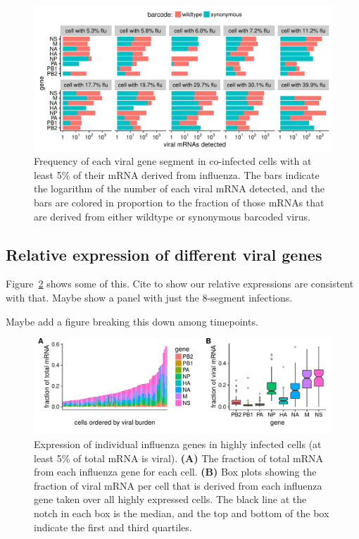 \documentclass[9pt,lineno]{elife}
\begin{document}
\begin{figure}
\includegraphics[width=\linewidth]{figures/p_coinfection.pdf}
\caption{
Frequency of each viral gene segment in co-infected cells with at least 5\% of their mRNA derived from influenza.
The bars indicate the logarithm of the number of each viral mRNA detected, and the bars are colored in proportion to the fraction of those mRNAs that are derived from either wildtype or synonymous barcoded virus.
}
\label{fig:coexpression}
\end{figure}

\subsection{Relative expression of different viral genes}
Figure~\ref{fig:fluexpr} shows some of this.
Cite \citet{hatada1989control} to show our relative expressions are consistent with that.
Maybe show a panel with just the 8-segment infections.

Maybe add a figure breaking this down among timepoints.

\begin{figure}
\includegraphics[width=\linewidth]{figures/p_flu_expr.pdf}
\caption{
Expression of individual influenza genes in highly infected cells (at least 5\% of total mRNA is viral).
{\bf (A)} 
The fraction of total mRNA from each influenza gene for each cell.
{\bf (B)}
Box plots showing the fraction of viral mRNA per cell that is derived from each influenza gene taken over all highly expressed cells.
The black line at the notch in each box is the median, and the top and bottom of the box indicate the first and third quartiles.
}
\label{fig:fluexpr}
\end{figure}
\end{document}

